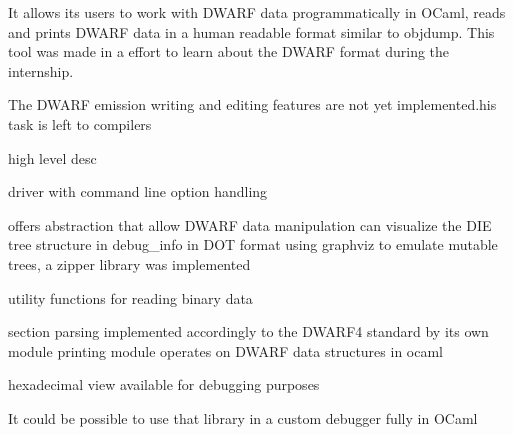 
It allows its users to work with DWARF data programmatically in OCaml,
reads and prints DWARF data in a human readable format similar to objdump.
This tool was made in a effort to learn about the DWARF format during the internship.

The DWARF emission writing and editing features are not yet implemented.his task is left to compilers

high level desc


driver with command line option handling

offers abstraction that allow DWARF data manipulation
can visualize the DIE tree structure in debug\_info in DOT format using graphviz
to emulate mutable trees, a zipper library was implemented

utility functions for reading binary data

section parsing implemented accordingly to the DWARF4 standard by its own module
printing module operates on DWARF data structures in ocaml

hexadecimal view available for debugging purposes

It could be possible to use that library in a custom debugger fully in OCaml
